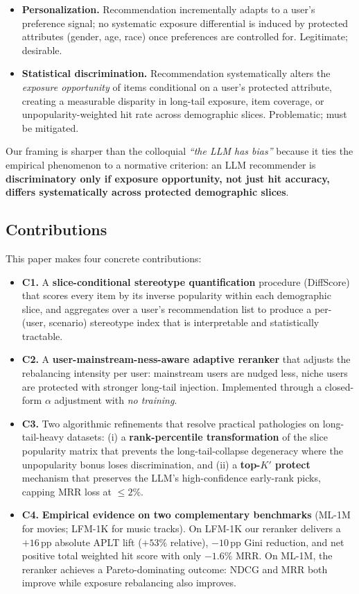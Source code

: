 \begin{itemize}
\item \textbf{Personalization.} Recommendation incrementally adapts to a user's preference signal; no systematic exposure differential is induced by protected attributes (gender, age, race) once preferences are controlled for. Legitimate; desirable.
\item \textbf{Statistical discrimination.} Recommendation systematically alters the \emph{exposure opportunity} of items conditional on a user's protected attribute, creating a measurable disparity in long-tail exposure, item coverage, or unpopularity-weighted hit rate across demographic slices. Problematic; must be mitigated.
\end{itemize}

Our framing is sharper than the colloquial \emph{``the LLM has bias''} because it ties the empirical phenomenon to a normative criterion: an LLM recommender is \textbf{discriminatory only if exposure opportunity, not just hit accuracy, differs systematically across protected demographic slices}.

\subsection{Contributions}

This paper makes four concrete contributions:

\begin{itemize}
\item \textbf{C1.} A \textbf{slice-conditional stereotype quantification} procedure (DiffScore) that scores every item by its inverse popularity within each demographic slice, and aggregates over a user's recommendation list to produce a per-(user, scenario) stereotype index that is interpretable and statistically tractable.

\item \textbf{C2.} A \textbf{user-mainstream-ness-aware adaptive reranker} that adjusts the rebalancing intensity per user: mainstream users are nudged less, niche users are protected with stronger long-tail injection. Implemented through a closed-form $\alpha$ adjustment with \emph{no training}.

\item \textbf{C3.} Two algorithmic refinements that resolve practical pathologies on long-tail-heavy datasets: (i) a \textbf{rank-percentile transformation} of the slice popularity matrix that prevents the long-tail-collapse degeneracy where the unpopularity bonus loses discrimination, and (ii) a \textbf{top-$K'$ protect} mechanism that preserves the LLM's high-confidence early-rank picks, capping MRR loss at $\leq 2\%$.

\item \textbf{C4.} \textbf{Empirical evidence on two complementary benchmarks} (ML-1M for movies; LFM-1K for music tracks). On LFM-1K our reranker delivers a $+16$\,pp absolute APLT lift (${+}53\%$ relative), $-10$\,pp Gini reduction, and net positive total weighted hit score with only $-1.6\%$ MRR. On ML-1M, the reranker achieves a Pareto-dominating outcome: NDCG and MRR both improve while exposure rebalancing also improves.
\end{itemize}

